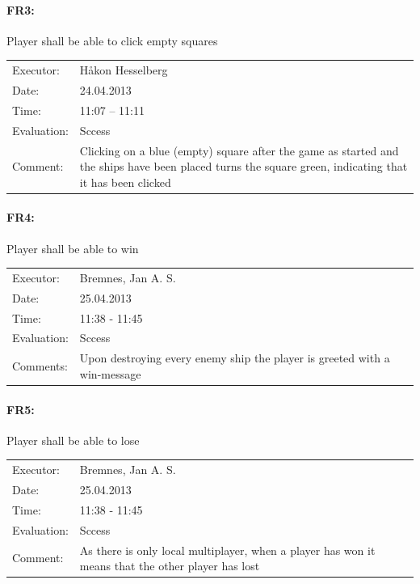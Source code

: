 \documentclass[12pt, a4paper]{article}
\begin{document}
\paragraph{FR3:} Player shall be able to click empty squares\\
\begin{tabular}{  p{}  p{} }
    Executor: & Håkon Hesselberg  \\
    Date: & 24.04.2013 \\
    Time: & 11:07 – 11:11 \\
    Evaluation: & Sccess \\
    Comment: & Clicking on a blue (empty) square after the game as started and
the ships have been placed turns the square green, indicating that it has been
clicked\\
\end{tabular}

\paragraph{FR4:} Player shall be able to win\\
\begin{tabular}{  p{}  p{} }
    Executor: & Bremnes, Jan A. S. \\
    Date: & 25.04.2013 \\
    Time: & 11:38 - 11:45  \\
    Evaluation: & Sccess \\
	Comments: & Upon destroying every enemy ship the player is greeted with a
win-message\\
\end{tabular}

\paragraph{FR5:}  Player shall be able to lose\\
\begin{tabular}{  p{}  p{} }
    Executor: & Bremnes, Jan A. S. \\
    Date: & 25.04.2013 \\
    Time: & 11:38 - 11:45  \\
    Evaluation: & Sccess \\
    Comment: & 
As there is only local multiplayer, when a player has won it means that the
other player has lost \\
\end{tabular}
\end{document}
